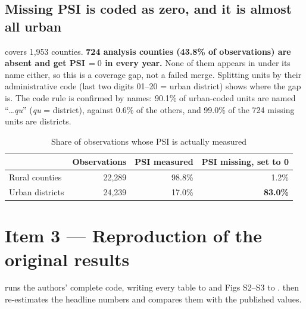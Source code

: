\documentclass[11pt]{article}
\begin{document}
\subsection{Missing PSI is coded as zero, and it is almost all urban}
 covers 1,953 counties. \textbf{724 analysis counties (43.8\% of observations) are absent and get PSI\,$=0$ in every year.} None of them appears in  under its name either, so this is a coverage gap, not a failed merge. Splitting units by their administrative code (last two digits 01--20 = urban district) shows where the gap is. The code rule is confirmed by names: 90.1\% of urban-coded units are named ``\ldots\emph{qu}'' (\emph{qu} = district), against 0.6\% of the others, and 99.0\% of the 724 missing units are districts.

\begin{table}[H]\centering\small
\caption{Share of observations whose PSI is actually measured}\label{tab:coverage}
\begin{tabular}{lrrr}
\toprule
& Observations & PSI measured & PSI missing, set to 0\\
\midrule
Rural counties & 22,289 & 98.8\% & 1.2\%\\
Urban districts & 24,239 & 17.0\% & \textbf{83.0\%}\\
\bottomrule
\end{tabular}
\end{table}

\section{Item 3 --- Reproduction of the original results}
 runs the authors' complete code, writing every table to  and Figs S2--S3 to .  then re-estimates the headline numbers and compares them with the published values.
\end{document}

